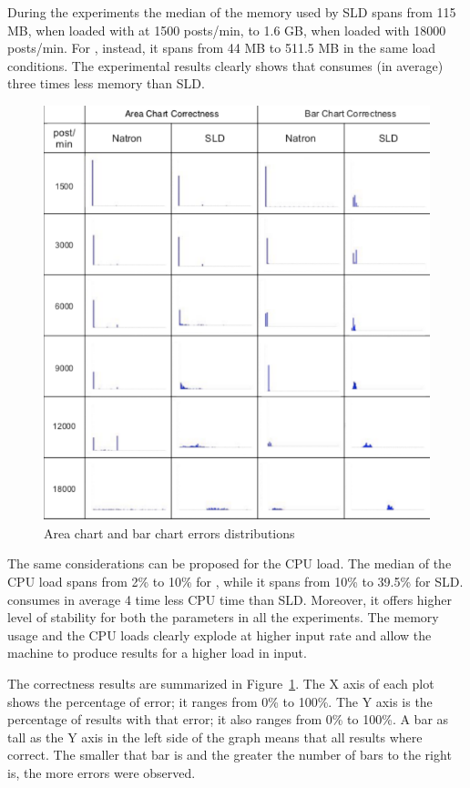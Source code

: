 During the experiments the median of the  memory used by SLD spans from 115 MB, when loaded with at 1500 posts/min, to 1.6 GB, when loaded with 18000 posts/min. For \sti{}, instead, it spans from 44 MB to 511.5 MB in the same load conditions. The experimental results clearly shows that \sti{} consumes (in average) three times less memory than SLD.

\begin{figure}[ht]
\centering
\includegraphics[width=\textwidth]{img/comp-mod-errors}
\caption{Area chart and bar chart errors distributions}
\label{fig:errors}
\end{figure}

The same considerations can be proposed for the CPU load. The median of the CPU load spans  from 2\% to 10\% for \sti{}, while it spans from 10\% to 39.5\% for SLD. \sti{} consumes in average 4 time less CPU time than SLD. 
Moreover, it offers higher level of stability for both the parameters in all the experiments. The memory usage and the CPU loads clearly explode at higher input rate and allow the machine to produce results for a higher load in input.

The correctness results are summarized in Figure~\ref{fig:errors}. The X axis of each plot shows the percentage of error; it ranges from 0\% to 100\%. The Y axis is the percentage of results with that error; it also ranges from 0\% to 100\%. A bar as tall as the Y axis in the left side of the graph means that all results where correct. The smaller that bar is and the greater the number of bars to the right is, the more errors were observed.

